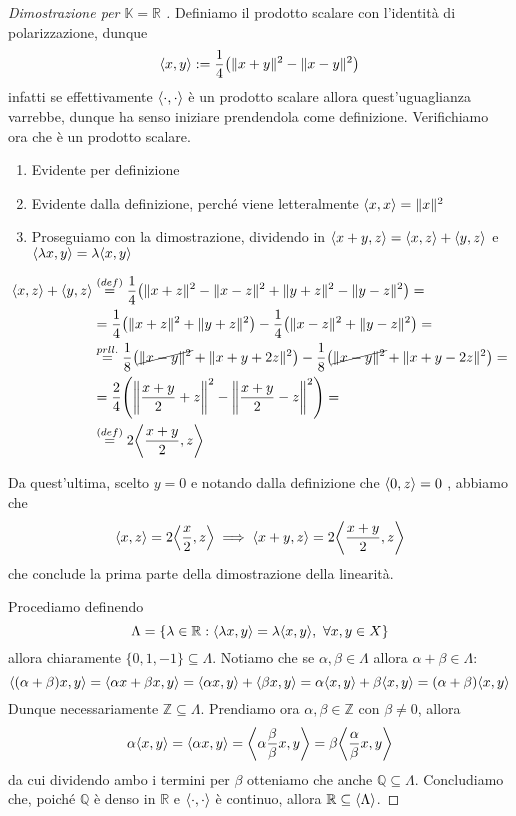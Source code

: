 \begin{proof}[Dimostrazione per \(\mathbb{K}=\mathbb{R}\) ]
    Definiamo il prodotto scalare con l'identità di polarizzazione, dunque
    \[
      {\left\langle x,y\right\rangle} := \frac{1}{4}{\left( \|x+y\|^2 - \|x-y\|^2 \right)} 
    \]
    infatti se effettivamente \({\left\langle\cdot ,\cdot \right\rangle} \) è un prodotto scalare
    allora quest'uguaglianza varrebbe, dunque ha senso iniziare prendendola come
    definizione. Verifichiamo ora che è un prodotto scalare.
\begin{enumerate}[label = \roman*.]
    \item Evidente per definizione
    \item Evidente dalla definizione, perché viene letteralmente \({\left\langle x,x\right\rangle} = \|x\|^2\) 
    \item Proseguiamo con la dimostrazione, dividendo in \({\left\langle x+y,z\right\rangle} = {\left\langle x,z\right\rangle} +{\left\langle y,z\right\rangle} \) e \({\left\langle\lambda x,y\right\rangle} = \lambda{\left\langle x,y\right\rangle} \) 
\end{enumerate}
    \begin{align*}
        {\left\langle x,z\right\rangle} + {\left\langle y,z\right\rangle} &\overset{(def)}{=} \frac{1}{4}{\left( \|x+z\|^2 - \|x-z\|^2 + \|y+z\|^2 - \|y-z\|^2 \right)} = \\
        &= \frac{1}{4}{\left( \|x+z\|^2 + \|y+z\|^2 \right)} - \frac{1}{4}{\left( \|x-z\|^2 + \|y-z\|^2 \right)} = \\
        &\overset{prll.}{=} \frac{1}{8}{\left(\cancel{ \|x-y\|^2} + \|x+y+2z\|^2 \right)} - \frac{1}{8}{\left( \cancel{\|x- y\|^2} + \|x + y - 2z\|^2 \right)} = \\
        &= \frac{2}{4} {\left( \left\| \frac{x+y}{2}+z \right\|^2 - \left\| \frac{x+y}{2} - z
\right\|^2\right)} = \\ &\overset{(def)}{=} 2{\left\langle\frac{x+y}{2}, z\right\rangle} 
    \end{align*}

    Da quest'ultima, scelto \(y=0\) e notando dalla definizione che \({\left\langle0,z\right\rangle}=0\)  , abbiamo che
    \[
     {\left\langle x,z\right\rangle} = 2{\left\langle\frac{x}{2}, z\right\rangle} \implies {\left\langle x+y, z\right\rangle} = 2{\left\langle\frac{x+y}{2}, z\right\rangle} 
    \]
    che conclude la prima parte della dimostrazione della linearità.

    Procediamo definendo
    \[
      \Lambda = \{\lambda \in \mathbb{R} : {\left\langle\lambda x, y\right\rangle} = \lambda{\left\langle x,y\right\rangle} , \,\, \forall x,y \in X\} 
    \]
    allora chiaramente \(\{0, 1, -1\} \subseteq \Lambda\). Notiamo che se \(\alpha, \beta \in \Lambda\) allora \(\alpha + \beta \in \Lambda\):
    \[
      {\left\langle{(\alpha + \beta)}x, y\right\rangle} = {\left\langle\alpha x + \beta x, y\right\rangle} = {\left\langle\alpha x, y\right\rangle}  + {\left\langle\beta x, y\right\rangle} = \alpha {\left\langle x,y\right\rangle} + \beta {\left\langle x,y\right\rangle} = {(\alpha + \beta)}{\left\langle x,y\right\rangle} 
    \]
    Dunque necessariamente \(\mathbb{Z} \subseteq \Lambda \). Prendiamo ora \(\alpha, \beta \in \mathbb{Z}\) con \(\beta \neq 0\), allora
    \[
      \alpha{\left\langle x,y\right\rangle} = {\left\langle\alpha x, y\right\rangle} = {\left\langle\alpha \frac{\beta}{\beta}x,
      y \right\rangle} = \beta {\left\langle\frac{\alpha}{\beta}x, y\right\rangle} 
    \]
    da cui dividendo ambo i termini per \(\beta\) otteniamo che anche \(\mathbb{Q} \subseteq \Lambda \).
    Concludiamo che, poiché \(\mathbb{Q}\) è denso in \(\mathbb{R}\) e \({\left\langle\cdot ,\cdot \right\rangle} \) è continuo, allora \(\mathbb{R} \subseteq {\left\langle\Lambda\right\rangle} \).
\end{proof}
